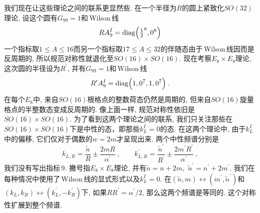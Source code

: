 我们现在让这些理论之间的联系更显然些. 在一个半径为$ R $的圆上紧致化$ SO(32) $理论, 设这个圆有$ G_{99}=1 $和\,Wilson\,线
\begin{equation}
    RA_{9}^{I}=\operatorname{diag}\Bigl(\tfrac{1}{2}^{8},0^{8}\Bigr)
    \label{11.6.18}
\end{equation}
一个指标取$ 1\leq A\leq 16 $而另一个指标取$ 17\leq A\leq 32 $的伴随态由于\,Wilson\,线因而是反周期的, 所以规范对称性就退化至$ SO(16)\times SO(16)$. 现在考察$ E_{8}\times E_{8} $理论, 这次圆的半径设为$ R^{\prime}$, 并有$ G_{99}=1 $和\,Wilson\,线
\begin{equation}
    R^{\prime}A_{9}^{I}=\operatorname{diag}\Bigl(1,0^{7},1,0^{7}\Bigr) \:.
    \label{11.6.19}
\end{equation}
在每个$ E_{8} $中, 来自$ SO(16) $根格点的整数荷态仍然是周期的, 但来自$ SO(16) $旋量格点的半整数态变成反周期的. 像上面一样, 规范对称性依旧是$ SO(16)\times SO(16)$. 为了看到这两个理论之间的联系, 我们只关注那些在$ SO(16)\times SO(16) $下是中性的态，即那些$ k_{L}^{I}=0 $的态. 在这两个理论中, 由于$ k_{L}^{I} $中的偏移, 它们仅对于偶数的$ w=2m $才呈现出来. 两个中性频谱分别是
\begin{equation}
    k_{L,R}=\frac{\tilde{n}}{R} \pm \frac{2mR}{\alpha^{\prime}}\:,\qquad k_{L,R}^{\prime} =\frac{\tilde{n}^{\prime}}{R^{\prime}} \pm \frac{2m^{\prime}R^{\prime}}{\alpha^{\prime}}\:,
\end{equation}
我们没有写出指标\,9. 撇号指$ E_{8}\times E_{8} $理论, 并有$ \tilde{n}=n+2m,$ $\tilde{n}^{\prime}=n^{\prime}+2m^{\prime}$. 我们在每种情况中使用了\,Wilson\,线的显式形式以及$ k_{L}^{I}=0$. 在$ (\tilde{n},m)\leftrightarrow (m^{\prime},\tilde{n}^{\prime}) $和$ (k_{L},k_{R})\leftrightarrow (k_{L}^{\prime},-k_{R}^{\prime}) $下, 如果$ RR^{\prime}=\alpha^{\prime}/2$, 那么这两个频谱是等同的. 这个对称性扩展到整个频谱.

